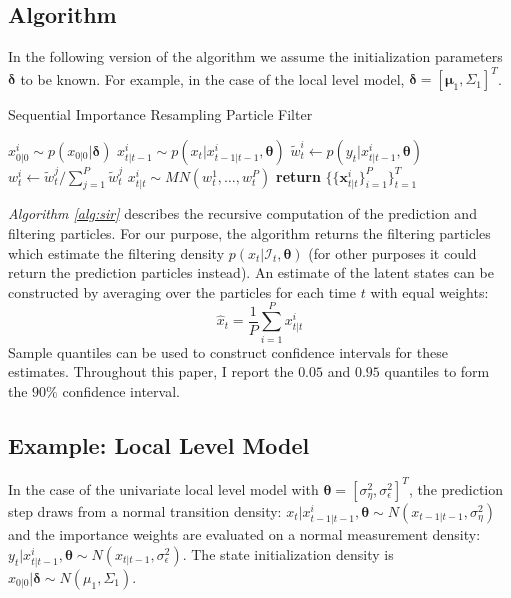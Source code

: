 \documentclass[11pt, oneside]{scrreprt}   	%
\begin{document}
\subsection{Algorithm}
In the following version of the algorithm we assume the initialization parameters $\boldsymbol{\delta}$ to be known. For example, in the case of the local level model, $\boldsymbol{\delta} = [\boldsymbol{\mu}_1, \Sigma_1]^T$.\\

\begin{algorithm}[h!]
\caption{Sequential Importance Resampling Particle Filter}
\label{alg:sir}
\begin{algorithmic}[1]
      	\smallskip
		\State $x_{0 | 0 }^i \sim p(x_{0 | 0 } | \boldsymbol{\delta})$ 
	\EndFor
      	\smallskip
      			\State $x_{t | t-1}^i \sim p(x_t | x_{t-1 | t-1}^i, \boldsymbol{\theta})$ 
			\smallskip
      			\State $\tilde{w}_t^i \gets p(y_t | x_{t | t-1}^i, \boldsymbol{\theta})$ 
		\EndFor	
		\smallskip
			\State $w_t^i \gets \tilde{w}_t^j / \sum_{j=1}^P \tilde{w}_t^j$ 
		\EndFor	
		\smallskip
			\State $x_{t | t }^i \sim MN(w_t^1, \ldots, w_t^P)$ 
		\EndFor
      \EndFor
      \State \textbf{return} $\{\{\boldsymbol{x}_{t | t}^i\}_{i=1}^P\}_{t=1}^T$
    \EndProcedure
  \end{algorithmic}
\end{algorithm}
\textit{Algorithm \ref{alg:sir}} describes the recursive computation of the prediction and filtering particles.  
For our purpose, the algorithm returns the filtering particles which estimate the filtering density $p(x_t | \mathcal{I}_t, \boldsymbol{\theta})$ (for other purposes it could return the prediction particles instead). 
An estimate of the latent states can be constructed by averaging over the particles for each time $t$ with equal weights: 
$$
\hat{x}_t = \frac{1}{P}\sum_{i=1}^P x_{t | t}^i
$$
Sample quantiles can be used to construct confidence intervals for these estimates. Throughout this paper, I report the $0.05$ and $0.95$ quantiles to form the $90\%$ confidence interval. 

\newpage
\subsection{Example: Local Level Model}
In the case of the univariate local level model with $\boldsymbol{\theta}=[\sigma_{\eta}^2, \sigma_{\epsilon}^2]^T$, the prediction step draws from a normal transition density: $x_t | x_{t-1 | t-1}^i, \boldsymbol{\theta} \sim N(x_{t-1 | t-1}, \sigma_{\eta}^2)$ and the importance weights are evaluated on a normal measurement density: $y_t | x_{t | t-1}^i, \boldsymbol{\theta} \sim N(x_{t | t-1}, \sigma_{\epsilon}^2)$. The state initialization density is $x_{0 | 0 } | \boldsymbol{\delta} \sim N(\mu_1, \Sigma_1)$.\\
\end{document}

